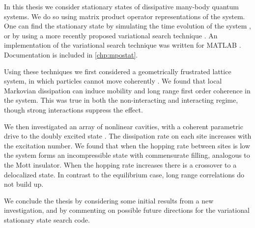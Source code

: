 In this thesis we consider stationary states of dissipative many-body quantum systems. We do so using matrix product operator representations of the system. One can find the stationary state by simulating the time evolution of the system \cite{Vidal2004,Schollwock2011}, or by using a more recently proposed variational search technique \cite{Cui2015,Mascarenhas2015}. An implementation of the variational search technique was written for MATLAB \cite{otb:gitVSSS,MATLAB}. Documentation is included in \cref{chp:mpostat}.

Using these techniques we first considered a geometrically frustrated lattice system, in which particles cannot move coherently \cite{Owen2017}. We found that local Markovian dissipation can induce mobility and long range first order coherence in the system. This was true in both the non-interacting and interacting regime, though strong interactions suppress the effect.

We then investigated an array of nonlinear cavities, with a coherent parametric drive to the doubly excited state \cite{Brown2018}. The dissipation rate on each site increases with the excitation number. We found that when the hopping rate between sites is low the system forms an incompressible state with commensurate filling, analogous to the Mott insulator. When the hopping rate increases there is a crossover to a delocalized state. In contrast to the equilibrium case, long range correlations do not build up.

We conclude the thesis by considering some initial results from a new investigation, and by commenting on possible future directions for the variational stationary state search code.